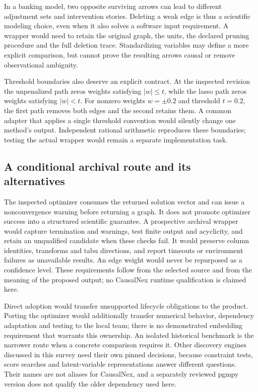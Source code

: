 In a banking model, two opposite surviving arrows can lead to different
adjustment sets and intervention stories. Deleting a weak edge is thus a
scientific modeling choice, even when it also solves a software input
requirement. A wrapper would need to retain the original graph, the units,
the declared pruning procedure and the full deletion trace. Standardizing
variables may define a more explicit comparison, but cannot prove the
resulting arrows causal or remove observational ambiguity.

Threshold boundaries also deserve an explicit contract. At the inspected
revision the unpenalized path zeros weights satisfying
$|w|\leq t$, while the lasso path zeros weights satisfying $|w|<t$.
For nonzero weights $w=\pm0.2$ and threshold $t=0.2$, the first path removes
both edges and the second retains them. A common adapter that applies a
single threshold convention would silently change one method's output.
Independent rational arithmetic reproduces these boundaries; testing the
actual wrapper would remain a separate implementation task.
\citep{exec14_causalnex_primary,exec14_causalnex_oracle}

\subsection{A conditional archival route and its alternatives}

The inspected optimizer consumes the returned solution vector and can issue a
nonconvergence warning before returning a graph. It does not promote optimizer
success into a structured scientific guarantee. A prospective archival
wrapper would capture termination and warnings, test finite output and
acyclicity, and retain an unqualified candidate when these checks fail. It
would preserve column identities, transforms and tabu directions, and report
timeouts or environment failures as unavailable results. An edge weight would
never be repurposed as a confidence level. These requirements follow from
the selected source and from the meaning of the proposed output; no CausalNex
runtime qualification is claimed here.~\citep{exec14_causalnex_primary}

Direct adoption would transfer unsupported lifecycle obligations to the
product. Porting the optimizer would additionally transfer numerical behavior,
dependency adaptation and testing to the local team; there is no demonstrated
embedding requirement that warrants this ownership. An isolated historical
benchmark is the narrower route when a concrete comparison requires it.
Other discovery engines discussed in this survey need their own pinned
decisions, because constraint tests, score searches and latent-variable
representations answer different questions. Their names are not aliases for
CausalNex, and a separately reviewed pgmpy version does not qualify the older
dependency used here.

